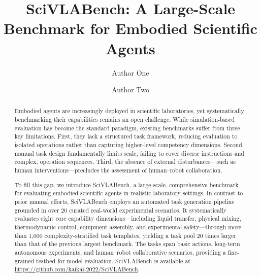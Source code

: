 \documentclass[sigconf]{acmart}
\begin{document}
\title{SciVLABench: A Large-Scale Benchmark for Embodied Scientific Agents}

\author{Author One}

\author{Author Two}
\correspondingauthor
{}

\renewcommand{\shortauthors}{Author One et al.}

\begin{abstract}
  Embodied agents are increasingly deployed in scientific laboratories, yet systematically benchmarking their capabilities remains an open challenge. While simulation-based evaluation has become the standard paradigm, existing benchmarks suffer from three key limitations. First, they lack a structured task framework, reducing evaluation to isolated operations rather than capturing higher-level competency dimensions. Second, manual task design fundamentally limits scale, failing to cover diverse instructions and complex, operation sequences. Third, the absence of external disturbances---such as human interventions---precludes the assessment of human--robot collaboration.

  To fill this gap, we introduce SciVLABench, a large-scale, comprehensive benchmark for evaluating embodied scientific agents in realistic laboratory settings. In contrast to prior manual efforts, SciVLABench employs an automated task generation pipeline grounded in over 20 curated real-world experimental scenarios. It systematically evaluates eight core capability dimensions---including liquid transfer, physical mixing, thermodynamic control, equipment assembly, and experimental safety---through more than 1,000 complexity-stratified task templates, yielding a task pool 20 times larger than that of the previous largest benchmark. The tasks span basic actions, long-term autonomous experiments, and human--robot collaborative scenarios, providing a fine-grained testbed for model evaluation. SciVLABench is available at \url{https://github.com/kaikai-2022/SciVLABench}.
\end{abstract}
\end{document}
